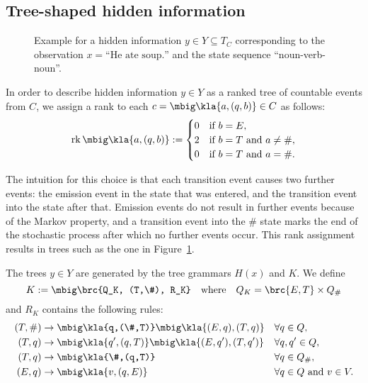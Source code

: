 \subsection{Tree-shaped hidden information}

\begin{figure}[t!]
 \centering
 \caption{Example for a hidden information $y\in Y\subseteq T_C$ corresponding
 to the observation $x = \text{``He ate soup.''}$ and the state sequence
 ``noun-verb-noun''.\label{fig:03-example-y}}
\end{figure}

In order to describe hidden information $y\in Y$ as a ranked tree of countable
events from $C$, we assign a rank to each $c = \mbig\kla{a,(q,b)}\in C$ as follows:
\begin{align*}
 \rk\mbig\kla{a,(q,b)} := \begin{cases}
  0 & \text{if } b = E, \\
  2 & \text{if } b = T \text{ and } a\neq\#, \\
  0 & \text{if } b = T \text{ and } a = \#.
 \end{cases}
\end{align*}

The intuition for this choice is that each transition event causes two further
events: the emission event in the state that was entered, and the transition
event into the state after that. Emission events do not result in further
events because of the Markov property, and a transition event into the $\#$
state marks the end of the stochastic process after which no further events
occur. This rank assignment results in trees such as the one in
Figure~\ref{fig:03-example-y}.

The trees $y\in Y$ are generated by the tree grammars $H(x)$ and $K$. We define
\[
 K := \mbig\brc{Q_K, (T,\#), R_K} \quad\text{where}\quad Q_K = \brc{E,T} \times Q_\#
\]
and $R_K$ contains the following rules:
\begin{align*}
 (T,\#) &\to \mbig\kla{q,(\#,T)}\mbig\kla{(E,q),(T,q)} &&\forall q\in Q, \\
 (T,q) &\to \mbig\kla{q',(q,T)}\mbig\kla{(E,q'),(T,q')} &&\forall q,q'\in Q, \\
 (T,q) &\to \mbig\kla{\#,(q,T)} &&\forall q\in Q_\#, \\
 (E,q) &\to \mbig\kla{v,(q,E)} &&\forall q\in Q \text{ and } v\in V.
\end{align*}


